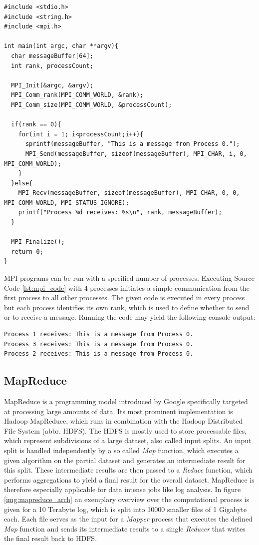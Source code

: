 \begin{lstlisting}[caption=MPI Code Example in C,captionpos=b,label=lst:mpi_code]
#include <stdio.h>
#include <string.h>
#include <mpi.h>

int main(int argc, char **argv){
  char messageBuffer[64];
  int rank, processCount;

  MPI_Init(&argc, &argv);
  MPI_Comm_rank(MPI_COMM_WORLD, &rank);
  MPI_Comm_size(MPI_COMM_WORLD, &processCount);

  if(rank == 0){
    for(int i = 1; i<processCount;i++){
      sprintf(messageBuffer, "This is a message from Process 0.");
      MPI_Send(messageBuffer, sizeof(messageBuffer), MPI_CHAR, i, 0, MPI_COMM_WORLD);
    }
  }else{
    MPI_Recv(messageBuffer, sizeof(messageBuffer), MPI_CHAR, 0, 0, MPI_COMM_WORLD, MPI_STATUS_IGNORE);
    printf("Process %d receives: %s\n", rank, messageBuffer);
  }

  MPI_Finalize();
  return 0;
}
\end{lstlisting}

MPI programs can be run with a specified number of processes. Executing Source Code \ref{lst:mpi_code} with 4 processes initiates a simple communication from the first process to all other processes. The given code is executed in every process but each process identifies its own rank, which is used to define whether to send or to receive a message. Running the code may yield the following console output:
\begin{Verbatim}[fontsize=\small]
Process 1 receives: This is a message from Process 0.
Process 3 receives: This is a message from Process 0.
Process 2 receives: This is a message from Process 0.
\end{Verbatim}

\subsection*{MapReduce}
MapReduce is a programming model introduced by Google specifically targeted at processing large amounts of data\cite{mapreduce}. Its most prominent implementation is Hadoop MapReduce, which runs in combination with the Hadoop Distributed File System (abbr. HDFS)\cite{hadoop_mapreduce}. The HDFS is mostly used to store processable files, which represent subdivisions of a large dataset, also called input splits. An input split is handled independently by a so called \textit{Map} function, which executes a given algorithm on the partial dataset and generates an intermediate result for this split. These intermediate results are then passed to a \textit{Reduce} function, which performs aggregations to yield a final result for the overall dataset. MapReduce is therefore especially applicable for data intense jobs like log analysis. In figure \ref{img:mapreduce_arch} an exemplary overview over the computational process is given for a 10 Terabyte log, which is split into 10000 smaller files of 1 Gigabyte each. Each file serves as the input for a \textit{Mapper} process that executes the defined \textit{Map} function and sends its intermediate results to a single \textit{Reducer} that writes the final result back to HDFS.

